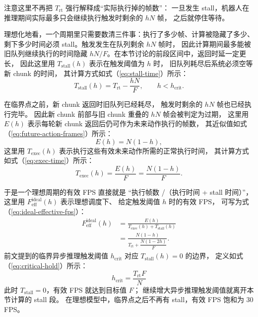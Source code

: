 注意这里不再把 $T_{\text{rt}}$ 强行解释成“实际执行掉的帧数”：
一旦发生 stall，机器人在推理期间实际最多只会继续执行触发时剩余的 $hN$ 帧，
之后就停住等待。

理想化地看，一个周期里只需要数清三件事：执行了多少帧、计算被隐藏了多少、
剩下多少时间必须 stall。触发发生在队列剩余 $hN$ 帧时，
因此计算期间最多能被旧队列继续执行的时间隐藏
$hN/F$。在本节讨论的前段区间中，返回时延一定更长，
因此这里用 $T_{\text{stall}}(h)$ 表示在触发阈值为 $h$ 时，
旧队列耗尽后系统必须空等新 chunk 的时间，
其计算方式如式（\ref{eq:stall-time}）所示：
\begin{equation}
  T_{\text{stall}}(h)
  =
  T_{\text{rt}}-\frac{hN}{F},
  \qquad h<h_{\text{crit}}.
  \label{eq:stall-time}
\end{equation}

在临界点之前，新 chunk 返回时旧队列已经耗尽，
触发时剩余的 $hN$ 帧也已经执行完毕。
因此新 chunk 前部与旧 chunk 重叠的 $hN$ 帧会被判定为过期，
这里用 $E(h)$ 表示每轮新 chunk 返回后仍可作为未来动作执行的帧数，
其近似值如式（\ref{eq:future-action-frames}）所示：
\begin{equation}
  E(h) = N(1-h),
  \label{eq:future-action-frames}
\end{equation}
这里用 $T_{\text{exec}}(h)$ 表示执行这些有效未来动作所需的正常执行时间，
其计算方式如式（\ref{eq:exec-time}）所示：
\begin{equation}
  T_{\text{exec}}(h) = \frac{E(h)}{F}
  = \frac{N(1-h)}{F}.
  \label{eq:exec-time}
\end{equation}

于是一个理想周期的有效 FPS 直接就是
“执行帧数 /（执行时间 + stall 时间）”，
这里用 $F_{\text{eff}}^{\text{ideal}}(h)$ 表示理想调度下、
给定触发阈值 $h$ 时的有效 FPS，
可写为式（\ref{eq:ideal-effective-fps}）：
\begin{equation}
  \begin{aligned}
  F_{\text{eff}}^{\text{ideal}}(h)
  &=
  \frac{E(h)}{T_{\text{exec}}(h)+T_{\text{stall}}(h)} \\
  &=
  \frac{N(1-h)}
       {T_{\text{rt}}+\dfrac{N(1-2h)}{F}}.
  \end{aligned}
  \label{eq:ideal-effective-fps}
\end{equation}
前文提到的临界异步推理触发阈值 $h_{\text{crit}}$
对应 $T_{\text{stall}}(h)=0$ 的边界，
定义如式（\ref{eq:critical-hold}）所示：
\begin{equation}
  h_{\text{crit}} = \frac{T_{\text{rt}}F}{N}
  \label{eq:critical-hold}
\end{equation}
此时 $T_{\text{stall}}=0$，有效 FPS 就达到目标值 $F$；
继续增大异步推理触发阈值就离开本节计算的 stall 段。
在理想模型中，临界点之后不再有 stall，有效 FPS 饱和为 30 FPS。

